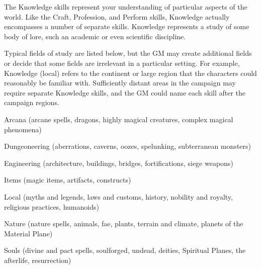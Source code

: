 \newpage
{}
  The Knowledge skills represent your understanding of particular aspects of the world.
  Like the Craft, Profession, and Perform skills, Knowledge actually encompasses a number of separate skills.
  Knowledge represents a study of some body of lore, such an academic or even scientific discipline.

  Typical fields of study are listed below, but the GM may create additional fields or decide that some fields are irrelevant in a particular setting.
  For example, Knowledge (local) refers to the continent or large region that the characters could reasonably be familiar with.
  Sufficiently distant areas in the campaign may require separate Knowledge skills, and the GM could name each skill after the campaign regions.
  \begin{raggeditemize}
    \item Arcana (arcane spells, dragons, highly magical creatures, complex magical phenomena)
    \item Dungeoneering (aberrations, caverns, oozes, spelunking, subterranean monsters)
    \item Engineering (architecture, buildings, bridges, fortifications, siege weapons)
    \item Items (magic items, artifacts, constructs)
    \item Local (myths and legends, laws and customs, history, nobility and royalty, religious practices, humanoids)
    \item Nature (nature spells, animals, fae, plants, terrain and climate, planets of the Material Plane)
    \item Souls (divine and pact spells, soulforged, undead, deities, Spiritual Planes, the afterlife, resurrection)
  \end{raggeditemize}

